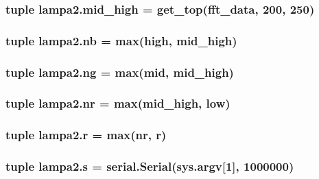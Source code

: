 \subsubsection[{mid\+\_\+high}]{\setlength{\rightskip}{0pt plus 5cm}tuple lampa2.\+mid\+\_\+high = {\bf get\+\_\+top}({\bf fft\+\_\+data}, 200, 250)}\label{namespacelampa2_ae7917682e1f41e81083f6c39c5224ced}
\hypertarget{namespacelampa2_a89200d5dd2e42d7b4610b7cb08f3719e}{}
\subsubsection[{nb}]{\setlength{\rightskip}{0pt plus 5cm}tuple lampa2.\+nb = max({\bf high}, {\bf mid\+\_\+high})}\label{namespacelampa2_a89200d5dd2e42d7b4610b7cb08f3719e}
\hypertarget{namespacelampa2_a4c322a1985723a114866aeda527ea89f}{}
\subsubsection[{ng}]{\setlength{\rightskip}{0pt plus 5cm}tuple lampa2.\+ng = max({\bf mid}, {\bf mid\+\_\+high})}\label{namespacelampa2_a4c322a1985723a114866aeda527ea89f}
\hypertarget{namespacelampa2_ad53fee82d4e84bd88c269579fbfaca7b}{}
\subsubsection[{nr}]{\setlength{\rightskip}{0pt plus 5cm}tuple lampa2.\+nr = max({\bf mid\+\_\+high}, {\bf low})}\label{namespacelampa2_ad53fee82d4e84bd88c269579fbfaca7b}
\hypertarget{namespacelampa2_a4ec3a7d05530e959b5ed5f4eb3e037c9}{}
\subsubsection[{r}]{\setlength{\rightskip}{0pt plus 5cm}tuple lampa2.\+r = max({\bf nr}, r)}\label{namespacelampa2_a4ec3a7d05530e959b5ed5f4eb3e037c9}
\hypertarget{namespacelampa2_ad18f2b839fd9605a96df3cadcf710a55}{}
\subsubsection[{s}]{\setlength{\rightskip}{0pt plus 5cm}tuple lampa2.\+s = serial.\+Serial(sys.\+argv\mbox{[}1\mbox{]}, 1000000)}\label{namespacelampa2_ad18f2b839fd9605a96df3cadcf710a55}
